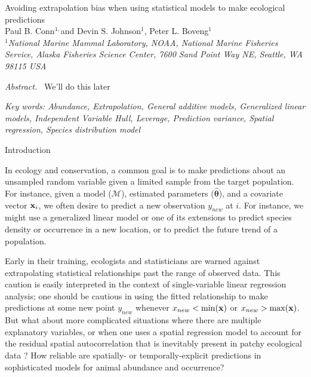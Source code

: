 \documentclass[12pt,english]{article}
\begin{document}
\begin{spacing}{1.9}

\begin{center}
Avoiding extrapolation bias when using statistical models to make ecological predictions
\bigskip\\
\normalsize
{\sc Paul B. Conn$^{1,}$\footnotemark[2] and
Devin S. Johnson$^1$, Peter L. Boveng$^1$ }\smallskip\\
$^1${\em National Marine Mammal Laboratory, NOAA, National Marine Fisheries Service,
Alaska Fisheries Science Center, 7600 Sand Point Way NE, Seattle,
WA 98115 USA }\\ \medskip
\end{center}


\raggedright \setlength{\parindent}{0.3in}
{}
 \linenumbers


{\em Abstract.\ } We'll do this later



{\em Key words: Abundance, Extrapolation, General additive models, Generalized linear models, Independent Variable Hull, Leverage, Prediction variance, Spatial regression, Species distribution model}

\centerline{\sc Introduction}


In ecology and conservation, a common goal is to make predictions about an unsampled random variable given a limited sample from the target population.  For instance, given a model ($\mathcal{M}$), estimated parameters ($\hat{\boldsymbol{\theta}}$), and a covariate vector ${\bf x}_i$, we often desire to predict a new observation $y_{new}$ at $i$.  For instance, we might use a generalized linear model \citep{McCullaghNelder1989} or one of its extensions to predict species density or occurrence in a new location, or to predict the future trend of a population.

Early in their training, ecologists and statisticians are warned against extrapolating statistical relationships
past the range of observed data.  This caution is easily interpreted in the context of single-variable linear regression analysis; one should be cautious in using the fitted relationship to make predictions at some new point $y_{new}$ whenever $x_{new} < \min({\bf x})$ or $x_{new} > \max({\bf x})$.  But what about more complicated situations
where there are multiple explanatory variables, or when one uses a spatial regression model to account for the residual spatial autocorrelation that is inevitably present in patchy ecological data \citep{LichsteinEtAl2002}?  How reliable are spatially- or temporally-explicit predictions in sophisticated models for animal abundance and occurrence?


\end{spacing}
\end{document}

